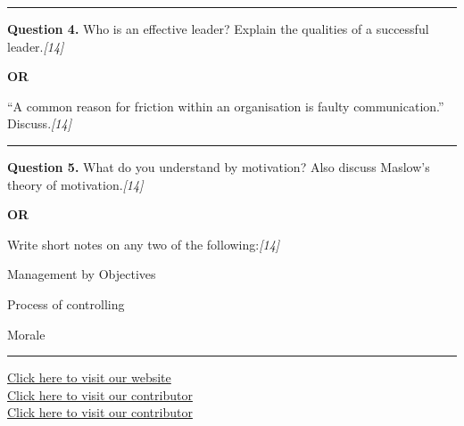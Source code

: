 \documentclass[11pt,a4paper]{article}
\newcommand{\pts}[1]{\hfill   \textit{[#1]}}
\begin{document}
\medskip\rule{\linewidth}{0.2pt}




\noindent   \textbf{Question 4.}
Who is an effective leader? Explain the qualities of a successful leader.\pts{14}

\centerline{   \textbf{OR}}

``A common reason for friction within an organisation is faulty communication.'' Discuss.\pts{14}

\medskip\rule{\linewidth}{0.2pt}




\noindent   \textbf{Question 5.}
What do you understand by motivation? Also discuss Maslow's theory of motivation.\pts{14}

\centerline{   \textbf{OR}}

Write short notes on any two of the following:\pts{14}

\begin{parts}
  \item Management by Objectives
  \item Process of controlling
  \item Morale
\end{parts}

\vfill
\rule{\linewidth}{0.4pt}

\begin{center}\small
\href{https://bhu-exam.vercel.app/}{Click here to visit our website}\\[4pt]
\href{https://me-aryan.vercel.app/}{Click here to visit our contributor}\\[4pt]
\href{https://quashan-me.vercel.app/}{Click here to visit our contributor}
\end{center}
\end{document}
